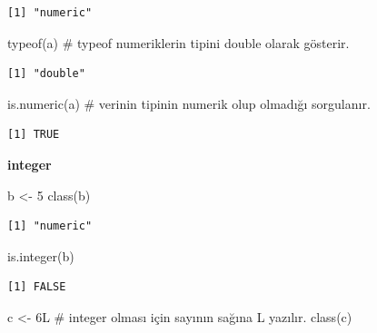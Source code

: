 \documentclass[
  letterpaper,
  DIV=11,
  numbers=noendperiod]{scrreprt}
\newenvironment{Shaded}{\begin{snugshade}}{\end{snugshade}}
\newcommand{\CommentTok}[1]{\textcolor[rgb]{0.37,0.37,0.37}{#1}}
\newcommand{\DecValTok}[1]{\textcolor[rgb]{0.68,0.00,0.00}{#1}}
\newcommand{\FunctionTok}[1]{\textcolor[rgb]{0.28,0.35,0.67}{#1}}
\newcommand{\NormalTok}[1]{\textcolor[rgb]{0.00,0.23,0.31}{#1}}
\newcommand{\OtherTok}[1]{\textcolor[rgb]{0.00,0.23,0.31}{#1}}
\begin{document}
\begin{verbatim}
[1] "numeric"
\end{verbatim}

\begin{Shaded}
\begin{Highlighting}[]
\FunctionTok{typeof}\NormalTok{(a) }\CommentTok{\# typeof numeriklerin tipini double olarak gösterir.}
\end{Highlighting}
\end{Shaded}

\begin{verbatim}
[1] "double"
\end{verbatim}

\begin{Shaded}
\begin{Highlighting}[]
\FunctionTok{is.numeric}\NormalTok{(a) }\CommentTok{\# verinin tipinin numerik olup olmadığı sorgulanır.}
\end{Highlighting}
\end{Shaded}

\begin{verbatim}
[1] TRUE
\end{verbatim}

\textbf{integer}

\begin{Shaded}
\begin{Highlighting}[]
\NormalTok{b }\OtherTok{\textless{}{-}} \DecValTok{5}
\FunctionTok{class}\NormalTok{(b)}
\end{Highlighting}
\end{Shaded}

\begin{verbatim}
[1] "numeric"
\end{verbatim}

\begin{Shaded}
\begin{Highlighting}[]
\FunctionTok{is.integer}\NormalTok{(b)}
\end{Highlighting}
\end{Shaded}

\begin{verbatim}
[1] FALSE
\end{verbatim}

\begin{Shaded}
\begin{Highlighting}[]
\NormalTok{c }\OtherTok{\textless{}{-}}\NormalTok{ 6L }\CommentTok{\# integer olması için sayının sağına L yazılır.}
\FunctionTok{class}\NormalTok{(c)}
\end{Highlighting}
\end{Shaded}
\end{document}
